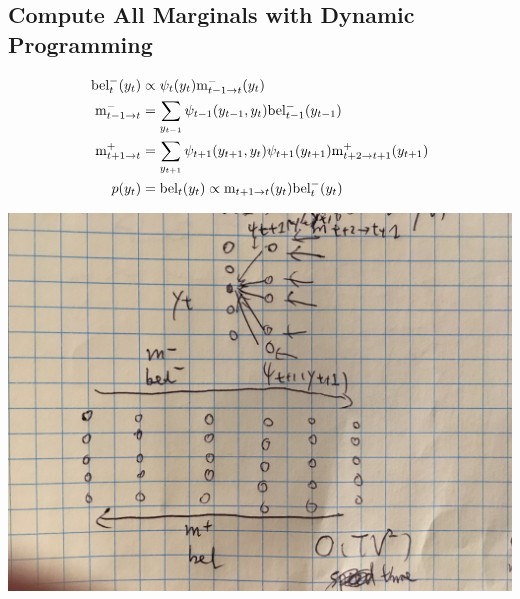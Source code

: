 \documentclass{article}
\begin{document}
\subsection{Compute All Marginals with Dynamic Programming}
\begin{align*}
\text{bel}_t^-(y_t) &\propto \psi_t(y_t) \text{m}_{t-1 \rightarrow t}^-(y_t)\\
\text{m}_{t-1\rightarrow t}^- &=\sum_{y_{t-1}}\psi_{t-1}(y_{t-1},y_t)\text{bel}_{t-1}^-(y_{t-1})\\
\text{m}_{t+1\rightarrow t}^+ &= \sum_{y_{t+1}}\psi_{t+1}(y_{t+1},y_t)\psi_{t+1}(y_{t+1})\text{m}_{t+2\rightarrow t+1}^+(y_{t+1})\\
p(y_t)&=\text{bel}_t(y_t)\propto \text{m}_{t+1\rightarrow t}(y_t)\text{bel}_t^-(y_t)
\end{align*}
\begin{center}
\includegraphics[scale=0.1]{g1.jpg}
\end{center}
\end{document}
